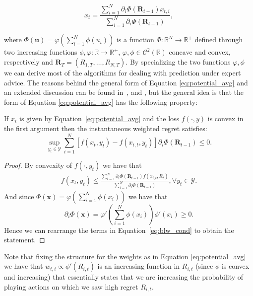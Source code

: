 \begin{equation}\label{eq:potential_avg}
x_t = \frac{\sum\limits_{i=1}^{N}\partial_i \Phi(\mathbf R_{t-1}) x_{t,i}}{\sum\limits_{i=1}^{N}\partial_i \Phi(\mathbf R_{t-1}) },
\end{equation}

where $\Phi(\mathbf u)=\varphi\left(\sum\limits_{i=1}^N\phi(u_i)\right)$ is a function $\Phi:\mathbb R^N\to\mathbb R^+$ defined through two increasing functions $\phi,\varphi:\mathbb R\to\mathbb R^+$, $\varphi,\phi\in\mathcal C^2(\mathbb R)$ concave and convex, respectively and $\mathbf R_T=(R_{1,T},\ldots,R_{N,T})$.
By specializing the two functions $\varphi,\phi$ we can derive most of the algorithms for dealing with prediction under expert advice.
The reasons behind the general form of Equation \eqref{eq:potential_avg} and an extended discussion can be found in~\cite{hart2001general}, \cite{cesa2003potential} and \cite{blackwell1956analog}, but the general idea is that the form of Equation \eqref{eq:potential_avg} has the following property:

\begin{theorem}\cite{cesa2003potential}
	If $x_t$ is given by Equation~\eqref{eq:potential_avg} and the loss $f(\cdot,y)$ is convex in the first argument then the instantaneous weighted regret satisfies:  
	$$\sup\limits_{y_t\in\mathcal Y}\sum\limits_{i=1}^N[f(x_t,y_t)-f(x_{i,t},y_t)]\partial_i \Phi(\mathbf R_{t-1}) \le 0.$$
\end{theorem}

\begin{proof}
	By convexity of $f(\cdot,y_t)$ we have that 
\begin{align}\label{eq:blw_cond}
	f(x_t,y_t)\le\frac{\sum\limits_{i=1}^N\partial_i\Phi(\mathbf R_{t-1})f(x_{i,t},R_t)}{\sum\limits_{i=1}^N\partial_i\Phi(\mathbf R_{t-1})}, \forall y_t\in\mathcal Y.
\end{align}
And since $\Phi(\mathbf x)=\varphi\left(\sum\limits_{i=1}^N \phi(x_i)\right)$ we have that $$\partial_i\Phi(\mathbf x)=\varphi'\left(\sum\limits_{i=1}^N\phi(x_i)\right)\phi'(x_i)\ge0.$$
Hence we can rearrange the terms in Equation~\eqref{eq:blw_cond} to obtain the statement.
\end{proof}

Note that fixing the structure for the weights as in Equation \eqref{eq:potential_avg} we have that $w_{t,i}\propto\phi'(R_{i,t})$ is an increasing function in $R_{i,t}$ (since $\phi$ is convex and increasing) that essentially states that we are increasing the probability of playing actions on which we saw high regret $R_{i,t}$.

